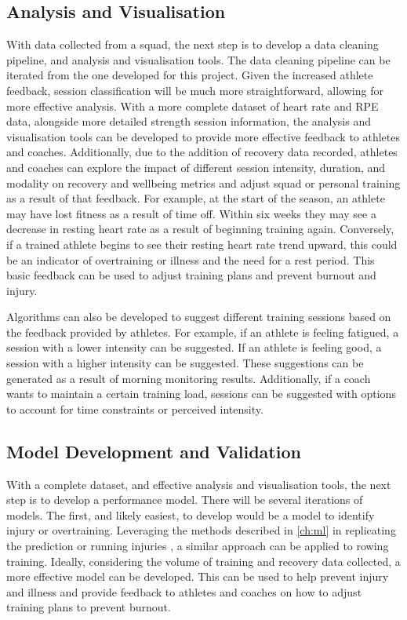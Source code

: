 \subsection{Analysis and Visualisation}
With data collected from a squad, the next step is to develop a data cleaning pipeline, and analysis and visualisation tools. The data cleaning pipeline can be iterated from the one developed for this project. Given the increased athlete feedback, session classification will be much more straightforward, allowing for more effective analysis. With a more complete dataset of heart rate and RPE data, alongside more detailed strength session information, the analysis and visualisation tools can be developed to provide more effective feedback to athletes and coaches. Additionally, due to the addition of recovery data recorded, athletes and coaches can explore the impact of different session intensity, duration, and modality on recovery and wellbeing metrics and adjust squad or personal training as a result of that feedback. For example, at the start of the season, an athlete may have lost fitness as a result of time off. Within six weeks they may see a decrease in resting heart rate as a result of beginning training again. Conversely, if a trained athlete begins to see their resting heart rate trend upward, this could be an indicator of overtraining or illness and the need for a rest period. This basic feedback can be used to adjust training plans and prevent burnout and injury.

Algorithms can also be developed to suggest different training sessions based on the feedback provided by athletes. For example, if an athlete is feeling fatigued, a session with a lower intensity can be suggested. If an athlete is feeling good, a session with a higher intensity can be suggested. These suggestions can be generated as a result of morning monitoring results. Additionally, if a coach wants to maintain a certain training load, sessions can be suggested with options to account for time constraints or perceived intensity.

\subsection{Model Development and Validation}
With a complete dataset, and effective analysis and visualisation tools, the next step is to develop a performance model. There will be several iterations of models. The first, and likely easiest, to develop would be a model to identify injury or overtraining. Leveraging the methods described in \autoref{ch:ml} in replicating the prediction or running injuries \cite{Lovdal2021}, a similar approach can be applied to rowing training. Ideally, considering the volume of training and recovery data collected, a more effective model can be developed. This can be used to help prevent injury and illness and provide feedback to athletes and coaches on how to adjust training plans to prevent burnout.

